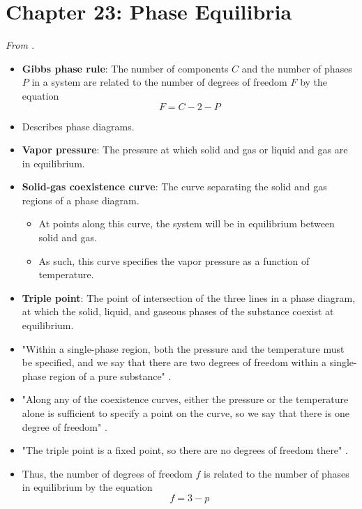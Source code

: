 \documentclass[../notes.tex]{subfiles}
\begin{document}
\section{Chapter 23: Phase Equilibria}
\emph{From \textcite{bib:McQuarrieSimon}.}
\begin{itemize}
    \item {}\textbf{Gibbs phase rule}: The number of components $C$ and the number of phases $P$ in a system are related to the number of degrees of freedom $F$ by the equation
    \begin{equation*}
        F = C-2-P
    \end{equation*}
    \item Describes phase diagrams.
    \item \textbf{Vapor pressure}: The pressure at which solid and gas or liquid and gas are in equilibrium.
    \item \textbf{Solid-gas coexistence curve}: The curve separating the solid and gas regions of a phase diagram.
    \begin{itemize}
        \item At points along this curve, the system will be in equilibrium between solid and gas.
        \item As such, this curve specifies the vapor pressure as a function of temperature.
    \end{itemize}
    \item \textbf{Triple point}: The point of intersection of the three lines in a phase diagram, at which the solid, liquid, and gaseous phases of the substance coexist at equilibrium.
    \item "Within a single-phase region, both the pressure and the temperature must be specified, and we say that there are two degrees of freedom within a single-phase region of a pure substance" \parencite[927]{bib:McQuarrieSimon}.
    \item "Along any of the coexistence curves, either the pressure or the temperature alone is sufficient to specify a point on the curve, so we say that there is one degree of freedom" \parencite[927]{bib:McQuarrieSimon}.
    \item "The triple point is a fixed point, so there are no degrees of freedom there" \parencite[927]{bib:McQuarrieSimon}.
    \item Thus, the number of degrees of freedom $f$ is related to the number of phases in equilibrium by the equation
    \begin{equation*}
        f = 3-p

\end{equation*}
\end{itemize}
\end{document}
